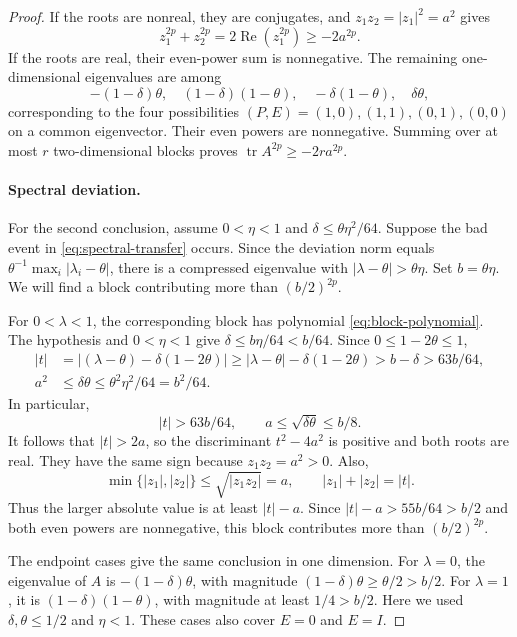 \documentclass[11pt]{article}
\theoremstyle{definition}
\theoremstyle{remark}
\theoremstyle{plain}
\DeclareMathOperator{\tr}{tr}
\begin{document}
\begin{proof}
If the roots are nonreal, they
are conjugates, and \(z_1z_2=|z_1|^2=a^2\) gives
\[
 z_1^{2p}+z_2^{2p}
       =2\operatorname{Re}(z_1^{2p})\ge-2a^{2p}.
\]
If the roots are real, their even-power sum is nonnegative.
The remaining one-dimensional eigenvalues are among
\[
 -(1-\delta)\theta,\quad (1-\delta)(1-\theta),\quad
                  -\delta(1-\theta),\quad \delta\theta,
\]
corresponding to the four possibilities
\((P,E)=(1,0),(1,1),(0,1),(0,0)\) on a common eigenvector.
Their even powers are nonnegative. Summing over at most \(r\)
two-dimensional blocks proves \(\tr A^{2p}\ge-2ra^{2p}\).

\paragraph{Spectral deviation.}
For the second conclusion, assume \(0<\eta<1\) and
\(\delta\le\theta\eta^2/64\). Suppose the bad event in
\eqref{eq:spectral-transfer} occurs.
Since the deviation norm equals
$\theta^{-1}\max_i|\lambda_i-\theta|$, there is a compressed eigenvalue with
\(|\lambda-\theta|>\theta\eta\). Set \(b=\theta\eta\).
We will find a block contributing more than \((b/2)^{2p}\).

For \(0<\lambda<1\), the corresponding block has polynomial
\eqref{eq:block-polynomial}. The hypothesis and \(0<\eta<1\) give
\(\delta\le b\eta/64<b/64\). Since \(0\le1-2\theta\le1\),
\[
 \begin{split}
 |t|&=|(\lambda-\theta)-\delta(1-2\theta)|
       \ge|\lambda-\theta|-\delta(1-2\theta)
       >b-\delta>63b/64,\\
 a^2&\le\delta\theta\le\theta^2\eta^2/64=b^2/64.
 \end{split}
\]
In particular,
\[
 |t|>63b/64,\qquad a\le\sqrt{\delta\theta}\le b/8.
\]
It follows that \(|t|>2a\), so the discriminant \(t^2-4a^2\)
is positive and both roots are real. They have the same sign
because \(z_1z_2=a^2>0\). Also,
\[
 \min\{|z_1|,|z_2|\}\le\sqrt{|z_1z_2|}=a,\qquad
 |z_1|+|z_2|=|t|.
\]
Thus the larger absolute value is at least \(|t|-a\).
Since \(|t|-a>55b/64>b/2\) and both even powers are nonnegative, this
block contributes more than \((b/2)^{2p}\).

The endpoint cases give the same conclusion in one dimension.
For \(\lambda=0\), the eigenvalue of \(A\) is
\(-(1-\delta)\theta\), with magnitude
\((1-\delta)\theta\ge\theta/2>b/2\).
For \(\lambda=1\), it is \((1-\delta)(1-\theta)\), with magnitude
at least \(1/4>b/2\). Here we used
\(\delta,\theta\le1/2\) and \(\eta<1\).
These cases also cover \(E=0\) and \(E=I\).


\end{proof}
\end{document}
